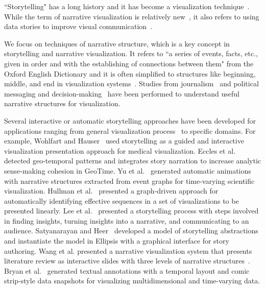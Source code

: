 \documentclass{vgtc}                          %
\begin{document}
``Storytelling" has a long history and it has become a visualization technique~\cite{Gershon:2001:SIV:381641.381653, 1626183, 6111347, 6412677, 7274435, wojtkowski2002storytelling}. 
While the term of narrative visualization is relatively new~\cite{segel2010narrative}, it also refers to using data stories to improve visual communication~\cite{hullman2011visualization, Hullman:2013:DUS:2553699.2553753, Satyanarayan:2014:ANV:2771495.2771532}.

We focus on techniques of narrative structure, which is a key concept in storytelling and narrative visualization.
It refers to ``a series of events, facts, etc., given in order and with the establishing of connections between them" from the Oxford English Dictionary and it is often simplified to structures like beginning, middle, and end in visualization systems~\cite{segel2010narrative}.
Studies from journalism~\cite{segel2010narrative}
and political messaging and decision-making~\cite{hullman2011visualization} have been performed to understand useful narrative structures for visualization.

Several interactive or automatic storytelling approaches have been developed for applications ranging from general visualization process~\cite{cruz2011generative, 4677364} 
to specific domains. %
For example, Wohlfart and Hauser~\cite{Wohlfart:2007:STP:2384179.2384194}
used storytelling as a guided and interactive visualization presentation approach for medical visualization.
Eccles et al.~\cite{4388992} detected geo-temporal patterns and integrates story narration to increase analytic sense-making cohesion in GeoTime.
Yu et al.~\cite{CGF:CGF1816} generated automatic animations with narrative structures extracted from event graphs for time-varying scientific visualization.
Hullman et al.~\cite{Hullman:2013:DUS:2553699.2553753} presented a graph-driven approach for automatically identifying effective sequences in a set of visualizations to be presented linearly.
Lee et al.~\cite{Lee:2013:STM:2553699.2553755} presented a storytelling process with steps involved in finding insights, turning insights into a narrative, and communicating to an audience. 
Satyanarayan and Heer~\cite{Satyanarayan:2014:ANV:2771495.2771532} developed a model of storytelling abstractions and instantiate the model in Ellipsis with a graphical interface for story authoring.
Wang et al. presented a narrative visualization system that presents literature review as interactive slides with three levels of narrative structures~\cite{Wang:2016:GTL:2968220.2968242}.
Bryan et al.~\cite{7539294} generated textual annotations with a temporal layout and comic strip-style data snapshots for visualizing multidimensional and time-varying data.
\end{document}
